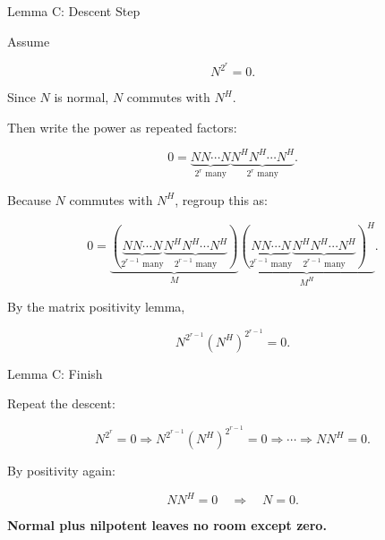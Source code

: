 \documentclass[10pt]{beamer}
\theoremstyle{definition}
\newcommand{\x}[1]{\alert{\textbf{#1}}}
\begin{document}
\begin{frame}[shrink=10]{Lemma C: Descent Step}

Assume

$$
N^{2^r}=0.
$$

\vfill

Since $N$ is normal, $N$ commutes with $N^H$.

\vfill

Then write the power as repeated factors:

$$
0=
\underbrace{NN\cdots N}_{2^r\text{ many}}
\underbrace{N^HN^H\cdots N^H}_{2^r\text{ many}}.
$$

\vfill

Because $N$ commutes with $N^H$, regroup this as:

$$
0=
\underbrace{
\left(
\underbrace{NN\cdots N}_{2^{r-1}\text{ many}}
\underbrace{N^HN^H\cdots N^H}_{2^{r-1}\text{ many}}
\right)}_{M}
\underbrace{
\left(
\underbrace{NN\cdots N}_{2^{r-1}\text{ many}}
\underbrace{N^HN^H\cdots N^H}_{2^{r-1}\text{ many}}
\right)^H}_{M^H}.
$$

\vfill

By the matrix positivity lemma,

$$
N^{2^{r-1}}(N^H)^{2^{r-1}}=0.
$$

\end{frame}

\begin{frame}{Lemma C: Finish}

Repeat the descent:

$$
N^{2^r}=0
\Rightarrow
N^{2^{r-1}}(N^H)^{2^{r-1}}=0
\Rightarrow\cdots\Rightarrow
NN^H=0.
$$

\vfill

By positivity again:

$$
NN^H=0\quad\Longrightarrow\quad N=0.
$$

\vfill

\begin{center}
\x{Normal plus nilpotent leaves no room except zero.}
\end{center}

\end{frame}
\end{document}
